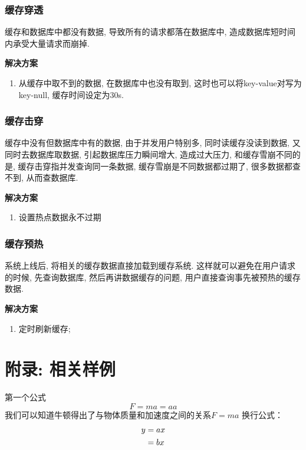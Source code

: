 \documentclass[UTF8]{ctexart}
\begin{document}
\subsubsection{缓存穿透}
缓存和数据库中都没有数据, 导致所有的请求都落在数据库中, 造成数据库短时间内承受大量请求而崩掉.
\par
\textbf{解决方案}
\begin{enumerate}
	
	\item 从缓存中取不到的数据, 在数据库中也没有取到, 这时也可以将key-value对写为key-null, 缓存时间设定为30s.
	
\end{enumerate}

\subsubsection{缓存击穿}
缓存中没有但数据库中有的数据, 由于并发用户特别多, 同时读缓存没读到数据, 又同时去数据库取数据, 引起数据库压力瞬间增大, 造成过大压力, 和缓存雪崩不同的是, 缓存击穿指并发查询同一条数据, 缓存雪崩是不同数据都过期了, 很多数据都查不到, 从而查数据库.
\par
\textbf{解决方案}
\begin{enumerate}
	
	\item 设置热点数据永不过期
	
\end{enumerate}
\subsubsection{缓存预热}
系统上线后, 将相关的缓存数据直接加载到缓存系统. 这样就可以避免在用户请求的时候, 先查询数据库, 然后再讲数据缓存的问题, 用户直接查询事先被预热的缓存数据.
\par
\textbf{解决方案}
\begin{enumerate}
	
	\item 定时刷新缓存;
	
\end{enumerate}







	\section{附录: 相关样例}
	第一个公式
	\begin{equation}
		F=ma=aa
	\end{equation}
	我们可以知道牛顿得出了与物体质量和加速度之间的关系$F=ma$
	换行公式：
	\begin{align}
		y &=ax\notag\\
		&=bx
	\end{align}
	
\end{document}
